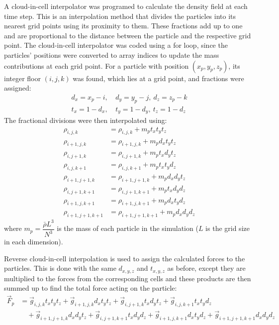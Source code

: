 \documentclass[12pt]{article}   	%
\begin{document}
A cloud-in-cell interpolator was programed to calculate the density field at each time step. This is an 
interpolation method that divides the particles into its nearest grid points using its proximity 
to them. These fractions add up to one and are proportional to the distance between the particle and 
the respective grid point.  The cloud-in-cell interpolator was coded using a for loop, since the particles' 
positions were converted to array indices to update the mass contributions at each grid point. For a 
particle with position $(x_p,y_p,z_p)$, its integer floor $(i,j,k)$ was found, which lies at a grid point, and 
fractions were assigned:
\begin{align*}
	d_x = x_p - i,\ & d_y = y_p - j,\ d_z = z_p - k\\
	t_x = 1 - d_x,\ & t_y = 1 - d_y,\ t_z = 1 - d_z
\end{align*}
The fractional divisions were then interpolated using:
\begin{align*}
	\rho_{i,j,k} &= \rho_{i,j,k} + m_pt_xt_yt_z\\
	\rho_{i+1,j,k} &= \rho_{i+1,j,k} + m_pd_xt_yt_z\\
	\rho_{i,j+1,k} &= \rho_{i,j+1,k} + m_pt_xd_yt_z\\
	\rho_{i,j,k+1} &= \rho_{i,j,k+1} + m_pt_xt_yd_z\\
	\rho_{i+1,j+1,k} &= \rho_{i+1,j+1,k} + m_pd_xd_yt_z\\
	\rho_{i,j+1,k+1} &= \rho_{i,j+1,k+1} + m_pt_xd_yd_z\\
	\rho_{i+1,j,k+1} &= \rho_{i+1,j,k+1} + m_pd_xt_yd_z\\
	\rho_{i+1,j+1,k+1} &= \rho_{i+1,j+1,k+1} + m_pd_xd_yd_z
\end{align*}
where $m_p = \dfrac{\bar\rho L^3}{N^3}$ is the mass of each particle in the simulation ($L$ is the grid
size in each dimension).

Reverse cloud-in-cell interpolation is used to assign the calculated forces to the particles. This is done 
with the same $d_{x,y,z}$ and $t_{x,y,z}$ as before, except they are multiplied to the forces from the 
corresponding cells and these products are then summed up to find the total force acting on the 
particle:
\begin{align}
	\vec F_p &= \vec g_{i,j,k}t_xt_yt_z+\vec g_{i+1,j,k}d_xt_yt_z+\vec g_{i,j+1,k}t_xd_yt_z
	+\vec g_{i,j,k+1}t_xt_yd_z \nonumber \\
	&\quad +\vec g_{i+1,j+1,k}d_xd_yt_z+\vec g_{i,j+1,k+1}t_xd_yd_z
	+\vec g_{i+1,j,k+1}d_xt_yd_z+\vec g_{i+1,j+1,k+1}d_xd_yd_z
\end{align}
\end{document}
